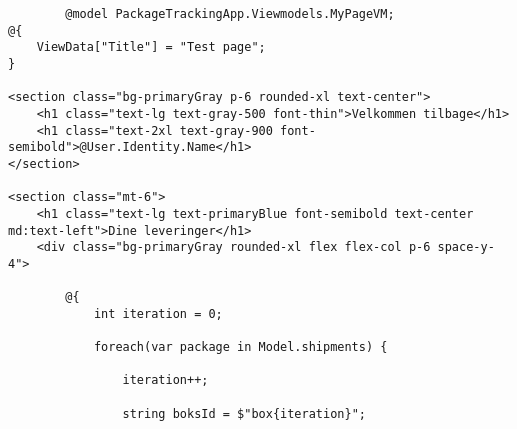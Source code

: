 \begin{verbatim}
        @model PackageTrackingApp.Viewmodels.MyPageVM;
@{
    ViewData["Title"] = "Test page";
}

<section class="bg-primaryGray p-6 rounded-xl text-center">
    <h1 class="text-lg text-gray-500 font-thin">Velkommen tilbage</h1>
    <h1 class="text-2xl text-gray-900 font-semibold">@User.Identity.Name</h1>
</section>

<section class="mt-6">
    <h1 class="text-lg text-primaryBlue font-semibold text-center md:text-left">Dine leveringer</h1>
    <div class="bg-primaryGray rounded-xl flex flex-col p-6 space-y-4">

        @{
            int iteration = 0;

            foreach(var package in Model.shipments) {

                iteration++;

                string boksId = $"box{iteration}";


\end{verbatim}
